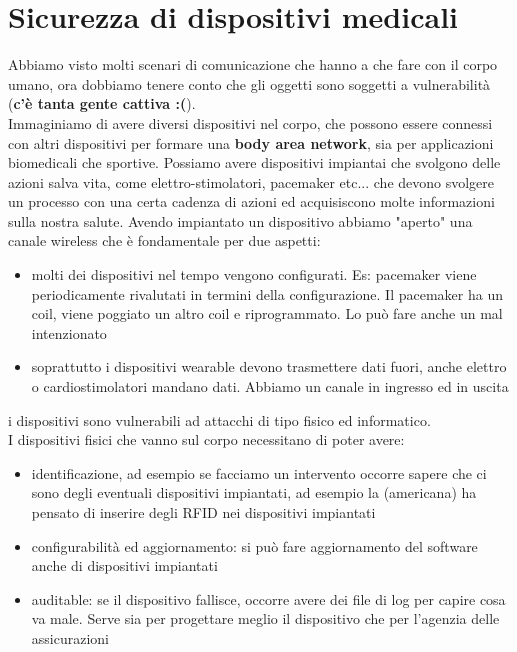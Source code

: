 \documentclass[oneside, 12pt]{extbook}
\begin{document}
\section{Sicurezza di dispositivi medicali}
Abbiamo visto molti scenari di comunicazione che hanno a che fare con il corpo umano, ora dobbiamo tenere conto che gli oggetti sono soggetti a vulnerabilità (\textsf{\textbf{c'è  tanta gente cattiva :(}}).\\Immaginiamo di avere diversi dispositivi nel corpo, che possono essere connessi con altri dispositivi per formare una \textbf{body area network}, sia per applicazioni biomedicali che sportive. Possiamo avere dispositivi impiantai che svolgono delle azioni salva vita, come elettro-stimolatori, pacemaker etc... che devono svolgere un processo con una certa cadenza di azioni ed acquisiscono molte informazioni sulla nostra salute. Avendo impiantato un dispositivo abbiamo "aperto" una canale wireless che è fondamentale per due aspetti:
\begin{itemize}
	\item molti dei dispositivi nel tempo vengono configurati. Es: pacemaker viene periodicamente rivalutati in termini della configurazione. Il pacemaker ha un coil, viene poggiato un altro coil e riprogrammato. Lo può fare anche un mal intenzionato
	\item soprattutto i dispositivi wearable devono trasmettere dati fuori, anche elettro o cardiostimolatori mandano dati. Abbiamo un canale in ingresso ed in uscita
\end{itemize}
i dispositivi sono vulnerabili ad attacchi di tipo fisico ed informatico.\\I dispositivi fisici che vanno sul corpo necessitano di poter avere:
\begin{itemize}
	\item identificazione, ad esempio se facciamo un intervento occorre sapere che ci sono degli eventuali dispositivi impiantati, ad esempio la (americana) ha pensato di inserire degli RFID nei dispositivi impiantati
	\item configurabilità ed aggiornamento: si può fare aggiornamento del software anche di dispositivi impiantati
	\item auditable: se il dispositivo fallisce, occorre avere dei file di log per capire cosa va male. Serve sia per progettare meglio il dispositivo che per l'agenzia delle assicurazioni
\end{itemize}
\end{document}
